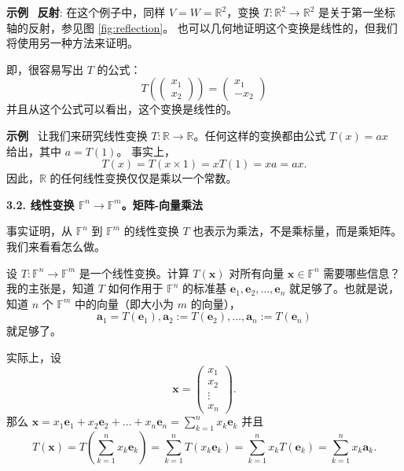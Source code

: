 \textbf{示例}~ 
\textbf{反射}: 在这个例子中，同样 $V = W = \mathbb{R}^2$，变换 $T : \mathbb{R}^2 \to \mathbb{R}^2$ 是关于第一坐标轴的反射，参见图 \ref{fig:reflection}。
也可以几何地证明这个变换是线性的，但我们将使用另一种方法来证明。

即，很容易写出 $T$ 的公式：
$$ T\left(\begin{pmatrix} x_1 \\ x_2 \end{pmatrix}\right) = \begin{pmatrix} x_1 \\ -x_2 \end{pmatrix} $$
并且从这个公式可以看出，这个变换是线性的。



\textbf{示例}~ 
让我们来研究线性变换 $T : \mathbb{R} \to \mathbb{R}$。任何这样的变换都由公式 $T(x) = ax$ 给出，其中 $a = T(1)$。
事实上，$$T(x) = T(x \times 1) = x T(1) = xa = ax.$$
因此，$\mathbb{R}$ 的任何线性变换仅仅是乘以一个常数。





\textbf{3.2. 线性变换 $\mathbb{F}^n \to \mathbb{F}^m$。矩阵-向量乘法}

事实证明，从 $\mathbb{F}^n$ 到 $\mathbb{F}^m$ 的线性变换 $T$ 也表示为乘法，不是乘标量，而是乘矩阵。我们来看看怎么做。

设 $T: \mathbb{F}^n \to \mathbb{F}^m$ 是一个线性变换。计算 $T(\mathbf{x})$ 对所有向量 $\mathbf{x} \in \mathbb{F}^n$ 需要哪些信息？我的主张是，知道 $T$ 如何作用于 $\mathbb{F}^n$ 的标准基 $\mathbf{e}_1, \mathbf{e}_2, \dots, \mathbf{e}_n$ 就足够了。也就是说，知道 $n$ 个 $\mathbb{F}^m$ 中的向量（即大小为 $m$ 的向量）， $$\mathbf{a}_1 = T(\mathbf{e}_1), \mathbf{a}_2 := T(\mathbf{e}_2), \dots, \mathbf{a}_n := T(\mathbf{e}_n)$$ 就足够了。

实际上，设 $$\mathbf{x} = \begin{pmatrix} x_1 \\ x_2 \\ \vdots \\ x_n \end{pmatrix}.$$那么 $\mathbf{x} = x_1 \mathbf{e}_1 + x_2 \mathbf{e}_2 + \dots + x_n \mathbf{e}_n = \sum_{k=1}^n x_k \mathbf{e}_k$ 并且 $$T(\mathbf{x}) = T(\sum_{k=1}^n x_k \mathbf{e}_k) = \sum_{k=1}^n T(x_k \mathbf{e}_k) = \sum_{k=1}^n x_k T(\mathbf{e}_k) = \sum_{k=1}^n x_k \mathbf{a}_k.$$

